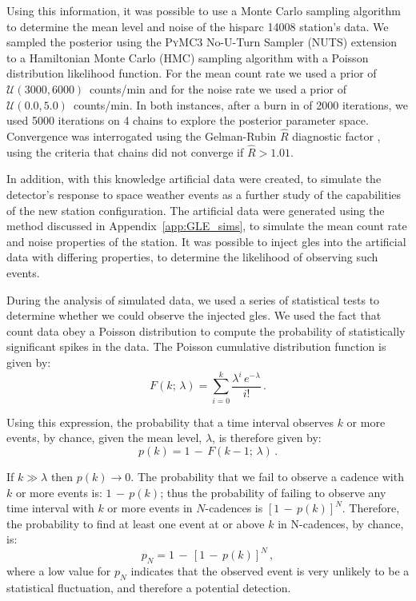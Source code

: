 Using this information, it was possible to use a Monte Carlo sampling algorithm to determine the mean level and noise of the \gls{hisparc} 14008 station's data. We sampled the posterior using the \textsc{PyMC3} No-U-Turn Sampler (NUTS) extension to a Hamiltonian Monte Carlo (HMC) sampling algorithm \citep{salvatier_probabilistic_2016} with a Poisson distribution likelihood function. For the mean count rate we used a prior of $\mathcal{U}(3000,6000)$~counts/min and for the noise rate we used a prior of $\mathcal{U}(0.0,5.0)$~counts/min. In both instances, after a burn in of 2000 iterations, we used 5000 iterations on 4 chains to explore the posterior parameter space. Convergence was interrogated using the Gelman-Rubin $\widehat{R}$ diagnostic factor \citep{gelman_inference_1992}, using the criteria that chains did not converge if $\widehat{R} > 1.01$.

In addition, with this knowledge artificial data were created, to simulate the detector's response to space weather events as a further study of the capabilities of the new station configuration. The artificial data were generated using the method discussed in Appendix~\ref{app:GLE_sims}, to simulate the mean count rate and noise properties of the station. It was possible to inject \glspl{gle} into the artificial data with differing properties, to determine the likelihood of observing such events.

During the analysis of simulated data, we used a series of statistical tests to determine whether we could observe the injected \glspl{gle}. We used the fact that count data obey a Poisson distribution to compute the probability of statistically significant spikes in the data. The Poisson cumulative distribution function is given by:
%
\begin{equation}
F(k; \, \lambda) = \sum_{i=0}^{k}  \frac{\lambda^i \, e^{-\lambda}}{i!} \, .
\label{eq:poisson_CDF}
\end{equation}


Using this expression, the probability that a time interval observes $k$ or more events, by chance, given the mean level, $\lambda$, is therefore given by: 
%
\begin{equation}
p(k) = 1 \, - \, F(k-1; \, \lambda) \, .
\label{eq:poisson_SF}
\end{equation}

If $k\gg\lambda$ then $p(k)\to0$. The probability that we fail to observe a cadence with $k$ or more events is: $1 \, - \, p(k)$; thus the probability of failing to observe any time interval with $k$ or more events in $N$-cadences is $[1 \, - \, p(k)]^N$. Therefore, the probability to find at least one event at or above $k$ in N-cadences, by chance, is:
%
\begin{equation}
p_N = 1\, - \, [1 \, - \, p(k)]^N \, ,
\label{eq:poisson_p_N}
\end{equation}
%
where a low value for $p_N$ indicates that the observed event is very unlikely to be a statistical fluctuation, and therefore a potential detection.

